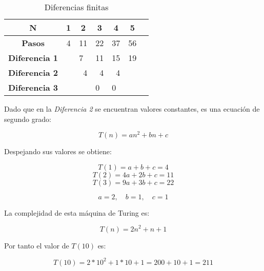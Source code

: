 \documentclass{uc3mpracticas}
\begin{document}
  \begin{table}[!h]
    \centering
    \begin{tabular}{|c|p{1cm}|p{1cm}|p{1cm}|p{1cm}|p{1cm}|p{1cm}|}
  \hline
  \textbf{N}     & \multicolumn{1}{c|}{\textbf{1}} & \multicolumn{1}{c|}{\textbf{2}} & \multicolumn{1}{c|}{\textbf{3}} & \multicolumn{1}{c|}{\textbf{4}} & \multicolumn{1}{c|}{\textbf{5}} \\ \hline
  \textbf{Pasos} & \multicolumn{1}{c|}{4}          & \multicolumn{1}{c|}{11}         & \multicolumn{1}{c|}{22}         & \multicolumn{1}{c|}{37}         & \multicolumn{1}{c|}{56}         \\ \hline
  \textbf{Diferencia 1}                  &                                                         & 7                                                       & 11                              & 15                              & 19                              \\ \hline
  \textbf{Diferencia 2}                  &                                                         & \multicolumn{1}{r|}{4}                                  & \multicolumn{1}{r|}{4}          & \multicolumn{1}{r|}{4}          &                                 \\ \hline
  \textbf{Diferencia 3}                  &                                                         &                                                         & 0                               & 0                               &                                 \\ \hline
  \end{tabular}
  \caption{Diferencias finitas}
  \end{table}


  Dado que en la \textit{Diferencia 2} se encuentran valores constantes, es una ecuación de segundo grado:

  $$ T(n) = an^2 + bn + c $$

  Despejando sus valores se obtiene:

  $$ T(1) = a + b + c = 4 $$
  $$ T(2) = 4a + 2b + c = 11 $$
  $$ T(3) = 9a + 3b + c = 22 $$

  $$ a = 2 ,\quad b = 1 ,\quad c = 1 $$

  La complejidad de esta máquina de Turing es:

  $$ T(n) = 2n^2 + n + 1 $$

  Por tanto el valor de $T(10)$ es:

  $$ T(10) = 2*10^2 + 1*10 + 1= 200 + 10 + 1 = 211 $$
\end{document}
